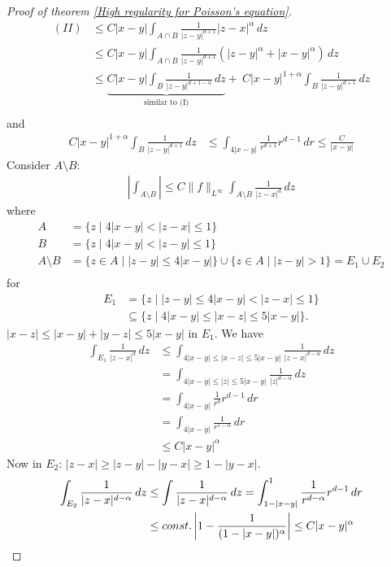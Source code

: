 \documentclass{report}
\theoremstyle{tommy}
\begin{document}
\begin{proof}[Proof of theorem \ref{High regularity for Poisson's equation}]
    \begin{align*}
      (II) &\le C |x-y| \int_{A \cap B} \frac{1}{|z-y|^{d+1}} |z-x|^\alpha \, dz \\
      &\le C |x-y| \int_{A \cap B} \frac{1}{|z-y|^{d+1}} \left(|z-y|^\alpha + |x-y|^\alpha\right) \, dz \\
      &\le \underbrace{C |x-y| \int_B \frac{1}{|z-y|^{d+1-\alpha}} \, dz}_{\text{similar to (I)}} +\ C |x-y|^{1+\alpha} \int_B \frac{1}{|z-y|^{d+1}} \, dz \\
    \end{align*}
    and \begin{align*}
      C |x-y|^{1+\alpha} \int_B \frac{1}{|z-y|^{d+1}} \, dz
      &\le \int_{4|x-y|} \frac{1}{r^{d+1}} r^{d-1} \, dr 
      \le \frac{C}{|x-y|}
    \end{align*}
    Consider \(A \setminus B\): 
    \begin{align*}
      \left| \int_{A \setminus B} \right| \le C \|f\|_{L^\infty} \int_{A \setminus B} \frac{1}{|z-x|^d} \, dz
    \end{align*}
    where
    \begin{align*}
      A &= \{z \mid 4 |x-y| < |z-x| \le 1\} \\
      B &= \{z \mid 4 |x-y| < |z-y| \le 1\} \\
      A \setminus B &= \{z \in A \mid |z-y| \le 4 |x-y|\} \cup \{z \in A \mid |z-y| > 1\} = E_1 \cup E_2 \\
    \end{align*}
    for 
    \begin{align*}
      E_1 &= \{z \mid |z-y| \le 4 |x-y| < |z-x| \le 1\} \\
      &\subseteq \{ z \mid 4 |x-y| \le |x-z| \le 5 |x-y| \}.
    \end{align*}
    \(|x-z| \le |x-y| + |y-z| \le 5 |x-y|\) in \(E_1\).
    We have 
    \begin{align*}
      \int_{E_1} \frac{1}{|z-x|^d} \, dz 
      &\le \int_{4|x-y| \le |x-z| \le 5 |x-y|} \frac{1}{|z-x|^{d-\alpha}} \, dz \\
      &= \int_{4|x-y| \le |z| \le 5 |x-y|} \frac{1}{|z|^{d-\alpha}} \, dz \\
      &= \int_{4|x-y|} \frac{1}{r^d} r^{d-1} \, dr \\
      &= \int_{4|x-y|} \frac{1}{r^{1-\alpha}} \, dr \\
      &\le C |x-y|^\alpha
    \end{align*}
    Now in \(E_2\): \(|z-x| \ge |z-y| - |y-x| \ge 1 - |y-x|\).
    \begin{align*}
      \int_{E_2} \frac{1}{|z-x|^{d-\alpha}} \, dz
      &\le \int \frac{1}{|z-x|^{d-\alpha}} \, dz
      = \int_{1-|x-y|}^1 \frac{1}{r^{d-\alpha}} r^{d-1} \, dr \\
      &\le const. \left| 1 - \frac{1}{(1 - |x-y|)^\alpha} \right| \le C |x-y|^\alpha \qedhere
    \end{align*}
  \end{proof}
\end{document}
